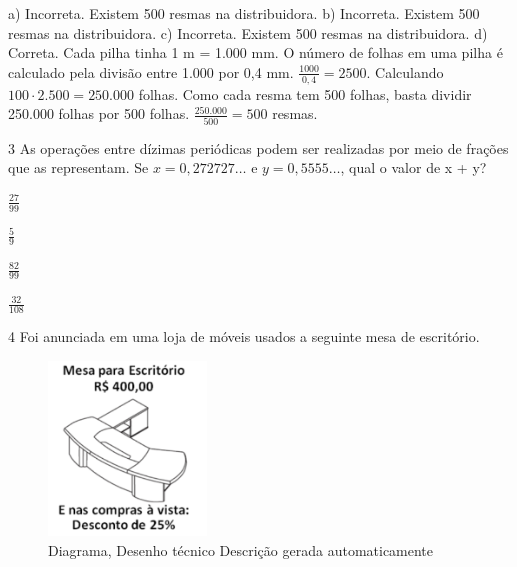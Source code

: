 {{{\begin{escolha}
{{{{{\begin{escolha}
\begin{escolha}
{\begin{q°}
{\begin{escolha}
\begin{escolha}
\begin{escolha}
\begin{escolha}
\begin{escolha}
\begin{escolha}
{a) Incorreta. Existem 500 resmas na distribuidora.
b) Incorreta. Existem 500 resmas na distribuidora.
c) Incorreta. Existem 500 resmas na distribuidora.
d) Correta. Cada pilha tinha 1 m = 1.000 mm. O número de folhas em
uma pilha é calculado pela divisão entre 1.000 por 0,4 mm.
$\frac{1000}{0,4} = 2500$. Calculando $100 \cdot 2.500 = 250.000$ folhas.
Como cada resma tem 500 folhas, basta dividir 250.000 folhas por 500
folhas. $\frac{250.000}{500} = 500$ resmas.}

\num{3} As operações entre dízimas periódicas podem ser realizadas 
por meio de frações que as representam. Se $x = 0,272727\ldots{}$ e 
$y = 0,5555\ldots{}$, qual o valor de x + y?

\begin{escolha}

\item $\frac{27}{99}$

\item $\frac{5}{9}$

\item $\frac{82}{99}$

\item $\frac{32}{108}$

\end{escolha}


\num{4} Foi anunciada em uma loja de móveis usados a seguinte mesa de
escritório.

\begin{figure}
\centering
\includegraphics[width=1.66071in,height=1.8286in]{./_SAEB_9_MAT/media/image262.png}
\caption{Diagrama, Desenho técnico Descrição gerada automaticamente}
\end{figure}


\end{escolha}
\end{escolha}
\end{escolha}
\end{escolha}
\end{escolha}
\end{escolha}}
\end{q°}}
\end{escolha}
\end{escolha}}}}}}
\end{escolha}}}}
